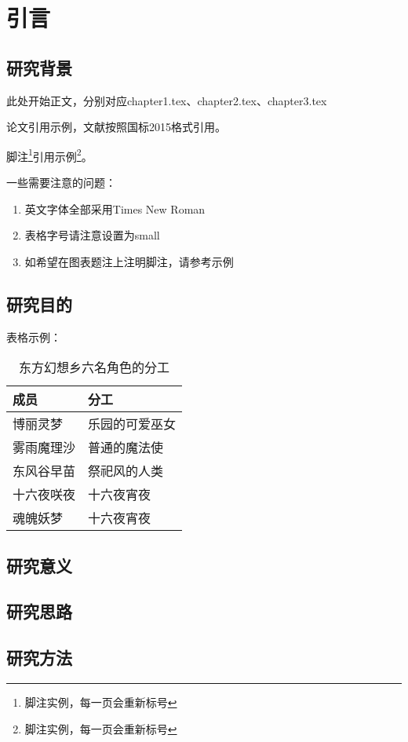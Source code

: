 \chapter{引言}

\section{研究背景}

此处开始正文，分别对应chapter1.tex、chapter2.tex、chapter3.tex

论文引用示例\cite{王宣承-1}，文献按照国标2015格式引用。

脚注\footnote{脚注实例，每一页会重新标号}引用示例\footnote{脚注实例，每一页会重新标号}。

一些需要注意的问题：
\begin{enumerate}
    \item 英文字体全部采用Times New Roman
    \item 表格字号请注意设置为small
    \item 如希望在图表题注上注明脚注，请参考示例
\end{enumerate}

\section{研究目的}

表格示例：
\begin{table}[H]
    \centering
    \small
    \caption{东方幻想乡六名角色的分工}
    \begin{tabularx}{\textwidth}{X >{\centering\arraybackslash}X}
        \toprule[1.0bp]
        成员    & 分工      \\
        \midrule[0.75bp]
        博丽灵梦  & 乐园的可爱巫女 \\
        雾雨魔理沙 & 普通的魔法使  \\
        东风谷早苗 & 祭祀风的人类  \\
        十六夜咲夜 & 十六夜宵夜   \\
        魂魄妖梦  & 十六夜宵夜   \\
        \bottomrule[1.0bp]
    \end{tabularx}
    \vspace{4bp}
\end{table}

\section{研究意义}

\section{研究思路}

\section{研究方法}
